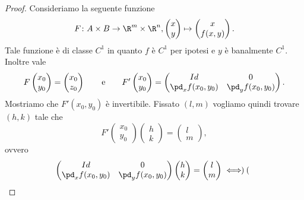 \begin{proof}
	Consideriamo la seguente funzione
	\[
		F \colon A \times B \to \R^m \times \R^n, \begin{pmatrix}x\\y\end{pmatrix} \mapsto 	\begin{pmatrix}
			x \\
			f(x,y)
		\end{pmatrix}.
	\]
	Tale funzione è di classe \(C^1\) in quanto \(f\) è \(C^1\) per ipotesi e \(y\) è banalmente \(C^1\).
	Inoltre vale
	\[
		F \begin{pmatrix}x_0\\y_0\end{pmatrix} = \begin{pmatrix}x_0\\z_0\end{pmatrix}
		\qquad\text{e}\qquad
		F' \begin{pmatrix}x_0\\y_0\end{pmatrix} = 	\begin{pmatrix}
			Id               & 0                \\
			\pd_x f(x_0,y_0) & \pd_y f(x_0,y_0)
		\end{pmatrix}.
	\]
	Mostriamo che \(F'(x_0,y_0)\) è invertibile.
	Fissato \((l,m)\) vogliamo quindi trovare \((h,k)\) tale che
	\[
		F' \begin{pmatrix}x_0\\y_0\end{pmatrix} \begin{pmatrix}h\\k\end{pmatrix} = \begin{pmatrix}l\\m\end{pmatrix},
	\]
	ovvero
	\[
		\begin{split}
			\begin{pmatrix}
				Id               & 0                \\
				\pd_x f(x_0,y_0) & \pd_y f(x_0,y_0)
			\end{pmatrix} \begin{pmatrix}h\\k\end{pmatrix} = \begin{pmatrix}l\\m\end{pmatrix} & \iff
			\begin{pmatrix}

\end{pmatrix}
\end{split}\]
\end{proof}
